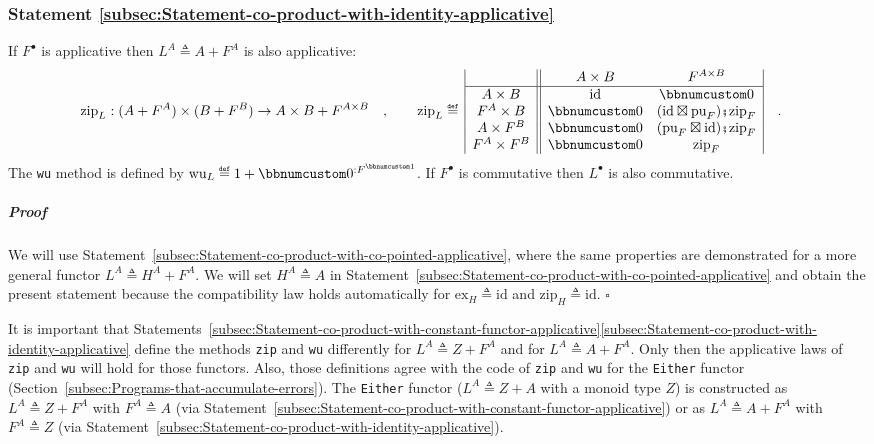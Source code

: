 \subsubsection{Statement \label{subsec:Statement-co-product-with-identity-applicative}\ref{subsec:Statement-co-product-with-identity-applicative}}

If $F^{\bullet}$ is applicative then $L^{A}\triangleq A+F^{A}$ is
also applicative:
\begin{align*}
 & \text{zip}_{L}:(A+F^{A})\times(B+F^{B})\rightarrow A\times B+F^{A\times B}\quad,\quad\quad\text{zip}_{L}\triangleq\,\begin{array}{|c||cc|}
 & A\times B & F^{A\times B}\\
\hline A\times B & \text{id} & \bbnum 0\\
F^{A}\times B & \bbnum 0 & (\text{id}\boxtimes\text{pu}_{F})\bef\text{zip}_{F}\\
A\times F^{B} & \bbnum 0 & (\text{pu}_{F}\boxtimes\text{id})\bef\text{zip}_{F}\\
F^{A}\times F^{B} & \bbnum 0 & \text{zip}_{F}
\end{array}\quad.
\end{align*}
The \lstinline!wu! method is defined by $\text{wu}_{L}\triangleq1+\bbnum 0^{:F^{\bbnum 1}}$.
If $F^{\bullet}$ is commutative then $L^{\bullet}$ is also commutative.

\subparagraph{Proof}

We will use Statement~\ref{subsec:Statement-co-product-with-co-pointed-applicative},
where the same properties are demonstrated for a more general functor
$L^{A}\triangleq H^{A}+F^{A}$. We will set $H^{A}\triangleq A$ in
Statement~\ref{subsec:Statement-co-product-with-co-pointed-applicative}
and obtain the present statement because the compatibility law holds
automatically for $\text{ex}_{H}\triangleq\text{id}$ and $\text{zip}_{H}\triangleq\text{id}$.
 $\square$

It is important that Statements~\ref{subsec:Statement-co-product-with-constant-functor-applicative}\textendash \ref{subsec:Statement-co-product-with-identity-applicative}
define the methods \lstinline!zip! and \lstinline!wu! differently
for $L^{A}\triangleq Z+F^{A}$ and for $L^{A}\triangleq A+F^{A}$.
Only then the applicative laws of \lstinline!zip! and \lstinline!wu!
will hold for those functors. Also, those definitions agree with the
code of \lstinline!zip! and \lstinline!wu! for the \lstinline!Either!
functor (Section~\ref{subsec:Programs-that-accumulate-errors}).
The \lstinline!Either! functor ($L^{A}\triangleq Z+A$ with a monoid
type $Z$) is constructed as $L^{A}\triangleq Z+F^{A}$ with $F^{A}\triangleq A$
(via Statement~\ref{subsec:Statement-co-product-with-constant-functor-applicative})
or as $L^{A}\triangleq A+F^{A}$ with $F^{A}\triangleq Z$ (via Statement~\ref{subsec:Statement-co-product-with-identity-applicative}).

